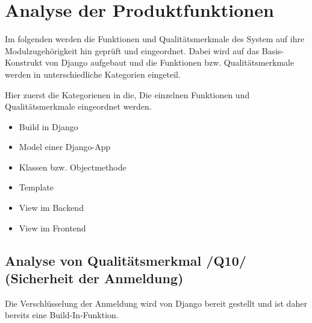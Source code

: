 \chapter{Analyse der Produktfunktionen}

%
%
Im folgenden werden die Funktionen und Qualitätsmerkmale des System auf ihre
Modulzugehörigkeit hin geprüft und eingeordnet. Dabei wird auf das
Basis-Konstrukt von Django aufgebaut und die Funktionen bzw. Qualitätsmerkmale
werden in unterschiedliche Kategorien eingeteil.

Hier zuerst die Kategorienen in die, Die einzelnen Funktionen und
Qualitätsmerkmale eingeordnet werden.
\begin{itemize}
	\item Build in Django
	\item Model einer Django-App
	\item Klassen bzw. Objectmethode
	\item Template
	\item View im Backend
	\item View im Frontend
\end{itemize}







\section{Analyse von Qualitätsmerkmal /Q10/ (Sicherheit der Anmeldung)}
Die Verschlüsselung der Anmeldung wird von Django bereit gestellt und ist daher
bereits eine Build-In-Funktion. 

